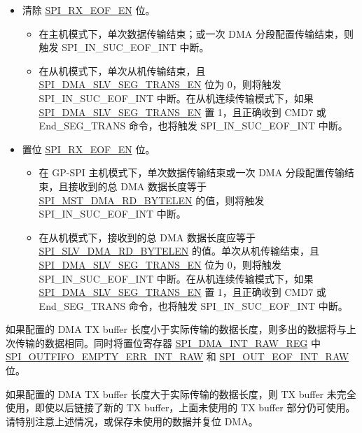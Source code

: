 \documentclass[main\_\_CN.tex]{subfiles}
\begin{document}
\begin{itemize}
    \item 清除 \hyperref[fielddesc:SPIRXEOFEN]{SPI\_RX\_EOF\_EN} 位。
        \begin{itemize}
            \item 在主机模式下，单次数据传输结束；或一次 DMA 分段配置传输结束，则触发 SPI\_IN\_SUC\_EOF\_INT 中断。

            \item 在从机模式下，单次从机传输结束，且 \hyperref[fielddesc:SPIDMASLVSEGTRANSEN]{SPI\_DMA\_SLV\_SEG\_TRANS\_EN} 位为 0，则将触发 SPI\_IN\_SUC\_EOF\_INT 中断。在从机连续传输模式下，如果 \hyperref[fielddesc:SPIDMASLVSEGTRANSEN]{SPI\_DMA\_SLV\_SEG\_TRANS\_EN} 置 1，且正确收到 CMD7 或 End\_SEG\_TRANS 命令，也将触发 SPI\_IN\_SUC\_EOF\_INT 中断。
        \end{itemize}

    \item 置位 \hyperref[fielddesc:SPIRXEOFEN]{SPI\_RX\_EOF\_EN} 位。
        \begin{itemize}
            \item 在 GP-SPI 主机模式下，单次数据传输结束或一次 DMA 分段配置传输结束，且接收到的总 DMA 数据长度等于 \hyperref[fielddesc:SPIMSTDMARDBYTELEN]{SPI\_MST\_DMA\_RD\_BYTELEN} 的值，则将触发 SPI\_IN\_SUC\_EOF\_INT 中断。

            \item 在从机模式下，接收到的总 DMA 数据长度应等于 \hyperref[fielddesc:SPISLVDMARDBYTELEN]{SPI\_SLV\_DMA\_RD\_BYTELEN} 的值。单次从机传输结束，且 \hyperref[fielddesc:SPIDMASLVSEGTRANSEN]{SPI\_DMA\_SLV\_SEG\_TRANS\_EN} 位为 0，则将触发 SPI\_IN\_SUC\_EOF\_INT 中断。在从机连续传输模式下，如果 \hyperref[fielddesc:SPIDMASLVSEGTRANSEN]{SPI\_DMA\_SLV\_SEG\_TRANS\_EN} 置 1，且正确收到 CMD7 或 End\_SEG\_TRANS 命令，也将触发 SPI\_IN\_SUC\_EOF\_INT 中断。
        \end{itemize}

\end{itemize}

如果配置的 DMA TX buffer 长度小于实际传输的数据长度，则多出的数据将与上次传输的数据相同。同时将置位寄存器 \hyperref[regdesc:SPIDMAINTRAWREG]{SPI\_DMA\_INT\_RAW\_REG} 中 \hyperref[fielddesc:SPIOUTFIFOEMPTYERRINTRAW]{SPI\_OUTFIFO\_EMPTY\_ERR\_INT\_RAW} 和 \hyperref[fielddesc:SPIOUTEOFINTRAW]{SPI\_OUT\_EOF\_INT\_RAW} 位。

如果配置的 DMA TX buffer 长度大于实际传输的数据长度，则 TX buffer 未完全使用，即使以后链接了新的 TX buffer，上面未使用的 TX buffer 部分仍可使用。请特别注意上述情况，或保存未使用的数据并复位 DMA。
\end{document}
